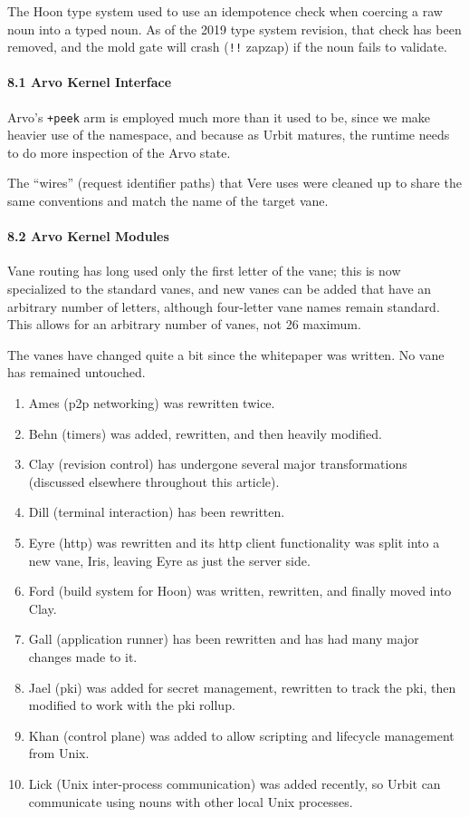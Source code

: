 \documentclass[twoside]{article}
\begin{document}
The Hoon type system used to use an idempotence check when coercing a raw noun into a typed noun.  As of the 2019 type system revision, that check has been removed, and the mold gate will crash (\lstinline[style=inlinecode]{!!} zapzap) if the noun fails to validate.

\paragraph{8.1 Arvo Kernel Interface}  Arvo's \lstinline[style=inlinecode]{+peek} arm is employed much more than it used to be, since we make heavier use of the namespace, and because as Urbit matures, the runtime needs to do more inspection of the Arvo state.

The ``wires'' (request identifier paths) that Vere uses were cleaned up to share the same conventions and match the name of the target vane.

\paragraph{8.2 Arvo Kernel Modules}  Vane routing has long used only the first letter of the vane; this is now specialized to the standard vanes, and new vanes can be added that have an arbitrary number of letters, although four-letter vane names remain standard.  This allows for an arbitrary number of vanes, not 26 maximum.

The vanes have changed quite a bit since the whitepaper was written.  No vane has remained untouched.

\begin{enumerate}
  \item  Ames (p2p networking) was rewritten twice.
  \item  Behn (timers) was added, rewritten, and then heavily modified.
  \item  Clay (revision control) has undergone several major transformations (discussed elsewhere throughout this article).
  \item  Dill (terminal interaction) has been rewritten.
  \item  Eyre ({\sc http}) was rewritten and its {\sc http} client functionality was split into a new vane, Iris, leaving Eyre as just the server side.
  \item  Ford (build system for Hoon) was written, rewritten, and finally moved into Clay.
  \item  Gall (application runner) has been rewritten and has had many major changes made to it.
  \item  Jael ({\sc pki}) was added for secret management, rewritten to track the {\sc pki}, then modified to work with the {\sc pki} rollup.
  \item  Khan (control plane) was added to allow scripting and lifecycle management from Unix.
  \item  Lick (Unix inter-process communication) was added recently, so Urbit can communicate using nouns with other local Unix processes.
\end{enumerate}
\end{document}
